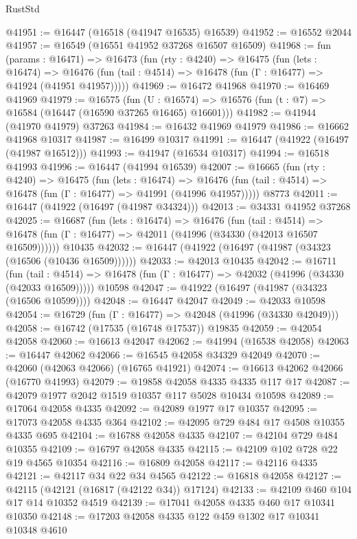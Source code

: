 \begin{lexlean}{RustStd}
\begin{coremodule}
@41951 := @16447 (@16518 (@41947 @16535) @16539)
@41952 := @16552 @2044
@41957 := @16549 (@16551 @41952 @37268 @16507 @16509)
@41968 := fun (params : @16471) =>
  @16473
    (fun (rty : @4240) =>
    @16475
      (fun (lets : @16474) =>
      @16476 (fun (tail : @4514) => @16478 (fun (Γ : @16477) => @41924 (@41951 @41957)))))
@41969 := @16472 @41968
@41970 := @16469 @41969
@41979 := @16575
    (fun (U : @16574) => @16576 (fun (t : @7) => @16584 (@16447 (@16590 @37265 @16465) @16601)))
@41982 := @41944 (@41970 @41979) @37263
@41984 := @16432 @41969 @41979
@41986 := @16662 @41968 @10317
@41987 := @16499 @10317
@41991 := @16447 (@41922 (@16497 (@41987 @16512)))
@41993 := @41947 (@16534 @10317)
@41994 := @16518 @41993
@41996 := @16447 (@41994 @16539)
@42007 := @16665
    (fun (rty : @4240) =>
    @16475
      (fun (lets : @16474) =>
      @16476 (fun (tail : @4514) => @16478 (fun (Γ : @16477) => @41991 (@41996 @41957)))))
    @8773
@42011 := @16447 (@41922 (@16497 (@41987 @34324)))
@42013 := @34331 @41952 @37268
@42025 := @16687
    (fun (lets : @16474) =>
    @16476
      (fun (tail : @4514) =>
      @16478 (fun (Γ : @16477) => @42011 (@41996 (@34330 (@42013 @16507 @16509))))))
    @10435
@42032 := @16447 (@41922 (@16497 (@41987 (@34323 (@16506 (@10436 @16509))))))
@42033 := @42013 @10435
@42042 := @16711
    (fun (tail : @4514) => @16478 (fun (Γ : @16477) => @42032 (@41996 (@34330 (@42033 @16509)))))
    @10598
@42047 := @41922 (@16497 (@41987 (@34323 (@16506 @10599))))
@42048 := @16447 @42047
@42049 := @42033 @10598
@42054 := @16729 (fun (Γ : @16477) => @42048 (@41996 (@34330 @42049)))
@42058 := @16742 (@17535 (@16748 @17537)) @19835
@42059 := @42054 @42058
@42060 := @16613 @42047
@42062 := @41994 (@16538 @42058)
@42063 := @16447 @42062
@42066 := @16545 @42058 @34329 @42049
@42070 := @42060 (@42063 @42066) (@16765 @41921)
@42074 := @16613 @42062 @42066 (@16770 @41993)
@42079 := @19858 @42058 @4335 @4335 @117 @17
@42087 := @42079 @1977 @2042 @1519 @10357 @117 @5028 @10434 @10598
@42089 := @17064 @42058 @4335
@42092 := @42089 @1977 @17 @10357
@42095 := @17073 @42058 @4335 @364
@42102 := @42095 @729 @484 @17 @4508 @10355 @4335 @695
@42104 := @16788 @42058 @4335
@42107 := @42104 @729 @484 @10355
@42109 := @16797 @42058 @4335
@42115 := @42109 @102 @728 @22 @19 @4565 @10354
@42116 := @16809 @42058
@42117 := @42116 @4335
@42121 := @42117 @34 @22 @34 @4565
@42122 := @16818 @42058
@42127 := @42115 (@42121 (@16817 (@42122 @34)) @17124)
@42133 := @42109 @460 @104 @17 @14 @10352 @4519
@42139 := @17041 @42058 @4335 @460 @17 @10341 @10350
@42148 := @17203 @42058 @4335 @122 @459 @1302 @17 @10341 @10348 @4610

\end{coremodule}
\end{lexlean}
